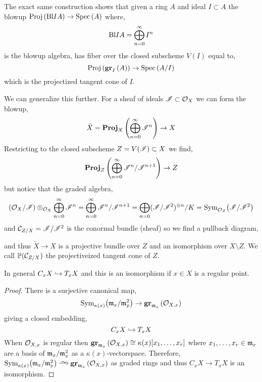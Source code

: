 \documentclass[12pt]{article}
\begin{document}
\begin{rmk}
The exact same construction shows that given a ring $A$ and ideal $I \subset A$ the blowup $\mathrm{Proj}\left( \mathrm{Bl}{I}{A} \right) \to \mathrm{Spec}\left( A \right)$ where,
\[ \mathrm{Bl}{I}{A} = \bigoplus_{n = 0}^\infty I^n \]
is the blowup algebra, has fiber over the closed subscheme $V(I)$ equal to,
\[ \mathrm{Proj}\left( \mathbf{gr}_{I}\left(A\right) \right) \to \mathrm{Spec}\left( A/I \right) \]
which is the projectized tangent cone of $I$. 
\end{rmk}

\begin{rmk}
We can generalize this further. For a sheaf of ideals $\mathscr{I} \subset \mathcal{O}_{X}$ we can form the blowup,
\[ \tilde{X} = \mathbf{Proj}_{X}\left( \bigoplus_{n = 0}^\infty \mathscr{I}^n \right) \to X \]
Restricting to the closed subscheme $Z = V(\mathscr{I}) \subset X$ we find,
\[ \mathbf{Proj}_{Z}\left( \bigoplus_{n = 0}^\infty \mathscr{I}^n / \mathscr{I}^{n+1} \right) \to Z \]
but notice that the graded algebra,
\[ (\mathcal{O}_{X} / \mathscr{I}) \otimes_{\mathcal{O}_{X}} \bigoplus_{n = 0}^\infty \mathscr{I}^n =  \bigoplus_{n = 0}^\infty \mathscr{I}^n / \mathscr{I}^{n+1} = \bigoplus_{n = 0} (\mathscr{I} / \mathscr{I}^2)^{\otimes n} / K = \mathrm{Sym}_{\mathcal{O}_{Z}}\! \left( \mathscr{I} / \mathscr{I}^2 \right) \]
and $\mathcal{C}_{Z/X} = \mathscr{I} / \mathscr{I}^2$ is the conormal bundle (sheaf) so we find a pullback diagram,
\begin{center}
\end{center}
and thus $\tilde{X} \to X$ is a projective bundle over $Z$ and an isomorphism over $X \setminus Z$. We call $\mathbb{P}(\mathcal{C}_{Z/X})$ the projectiveized tangent cone of $Z$.
\end{rmk}

\begin{prop}
In general $C_x X \hookrightarrow T_x X$ and this is an isomorphism if $x \in X$ is a regular point.
\end{prop}

\begin{proof}
There is a surjective canonical map,
\[ \mathrm{Sym}_{\kappa(x)}\! \left( \mathfrak{m}_x/\mathfrak{m}_x^2 \right) \to \mathbf{gr}_{\mathfrak{m}_x}\left(\mathcal{O}_{X, x}\right) \]
giving a closed embedding,
\[ C_x X \hookrightarrow T_x X \]
When $\mathcal{O}_{X, x}$ is regular then $\mathbf{gr}_{\mathfrak{m}_x}\left(\mathcal{O}_{X, x}\right) \cong \kappa(x)[x_1, \dots, x_r]$ where $x_1, \dots, x_r \in \mathfrak{m}_x$ are a basis of $\mathfrak{m}_x / \mathfrak{m}_x^2$ as a $\kappa(x)$-vectorspace. Therefore,  $\Sym{\kappa(x)}{\m_x / \m_x^2} \iso \gr{\m_x}{\stalk{X}{x}}$ as graded rings and thus $C_x X \to T_x X$ is an isomorphism.
\end{proof}
\end{document}
